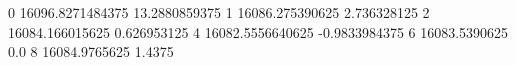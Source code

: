 0 16096.8271484375 13.2880859375
1 16086.275390625 2.736328125
2 16084.166015625 0.626953125
4 16082.5556640625 -0.9833984375
6 16083.5390625 0.0
8 16084.9765625 1.4375
